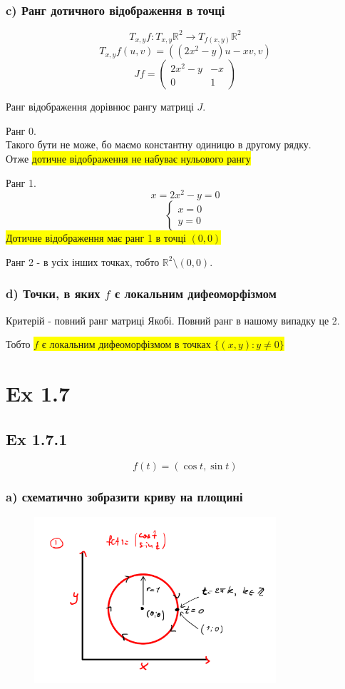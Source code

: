 \documentclass[10pt, a4paper]{article} %
\newcommand{\R}{\mathbb{R}}
\begin{document}
\subsubsection*{c) Ранг дотичного відображення в точці}
\[T_{x,y}f : T_{x,y}\R^2 \to T_{f(x,y)}\R^2\]
\[T_{x,y}f(u,v) = ((2x^2-y)u-xv, v)\]
\[Jf = \begin{pmatrix}
    2x^2-y & -x\\
        0 & 1
\end{pmatrix}\]

Ранг відображення дорівнює рангу матриці $J$. 

Ранг 0.\\
Такого бути не може, бо маємо константну одиницю в другому рядку. \\
Отже \colorbox{yellow}{дотичне відображення не набуває нульового рангу}

Ранг 1.
\[x=2x^2-y=0\]
\[\begin{cases}
    x = 0\\
    y = 0
\end{cases}\]
\colorbox{yellow}{Дотичне відображення має ранг 1 в точці $(0,0)$}

Ранг 2 - в усіх інших точках, тобто $\R^2 \setminus (0,0)$.

\subsubsection*{d) Точки, в яких $f$ є локальним дифеоморфізмом}
Критерій - повний ранг матриці Якобі.
Повний ранг в нашому випадку це 2.

Тобто \colorbox{yellow}{$f$ є локальним дифеоморфізмом в точках $\{(x,y) : y\ne 0\}$}


\section*{Ex 1.7}

\subsection*{Ex 1.7.1}
\[f(t) = (\cos t, \sin t)\]

\subsubsection*{a) схематично зобразити криву на площині}
\begin{figure}[h]
    \includegraphics[width=0.8\textwidth]{1.7.1.png}
    \centering
\end{figure}
\end{document}
